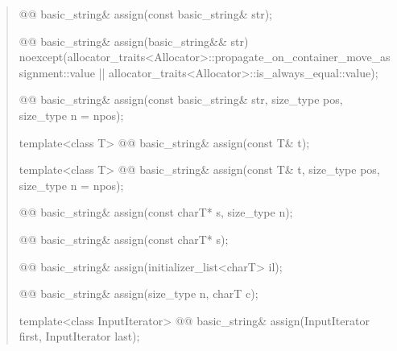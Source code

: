 \documentclass{wg21}
\begin{document}
\begin{quote}
\begin{itemdecl}
@@ basic_string& assign(const basic_string& str);
\end{itemdecl}

\begin{itemdecl}
@@ basic_string& assign(basic_string&& str)
  noexcept(allocator_traits<Allocator>::propagate_on_container_move_assignment::value ||
           allocator_traits<Allocator>::is_always_equal::value);
\end{itemdecl}

\begin{itemdecl}
@@ basic_string& assign(const basic_string& str, size_type pos, size_type n = npos);
\end{itemdecl}

\begin{itemdecl}
template<class T>
  @@ basic_string& assign(const T& t);
\end{itemdecl}

\begin{itemdecl}
template<class T>
  @@ basic_string& assign(const T& t, size_type pos, size_type n = npos);
\end{itemdecl}

\begin{itemdecl}
@@ basic_string& assign(const charT* s, size_type n);
\end{itemdecl}

\begin{itemdecl}
@@ basic_string& assign(const charT* s);
\end{itemdecl}

\begin{itemdecl}
@@ basic_string& assign(initializer_list<charT> il);
\end{itemdecl}

\begin{itemdecl}
@@ basic_string& assign(size_type n, charT c);
\end{itemdecl}

\begin{itemdecl}
template<class InputIterator>
  @@ basic_string& assign(InputIterator first, InputIterator last);
\end{itemdecl}
\end{quote}
\end{document}
